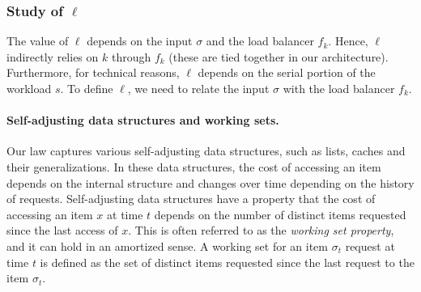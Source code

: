 





\subsubsection{Study of $\ell$}


The value of $\ell$ depends on the input $\sigma$ and the load balancer $f_k$. Hence, $\ell$ indirectly relies on $k$ through $f_k$ (these are tied together in our architecture). Furthermore, for technical reasons, $\ell$ depends on the serial portion of the workload $s$.
To define $\ell$, we need to relate the input $\sigma$ with the load balancer $f_k$.

\paragraph*{Self-adjusting data structures and working sets.}
Our law captures various self-adjusting data structures, such as lists, caches and their generalizations.
In these data structures, the cost of accessing an item depends on the internal structure and changes over time depending on the history of requests.
Self-adjusting data structures have a property that the cost of accessing an item $x$ at time $t$ depends on the number of distinct items requested since the last access of $x$.
This is often referred to as the \emph{working set property}, and it can hold in an amortized sense.
A working set for an item $\sigma_t$ request at time $t$ is defined as the set of distinct items requested since the last request to the item $\sigma_t$.

